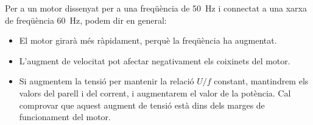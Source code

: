 Per a un motor dissenyat per a una freqüència de \qty{50}{Hz} i connectat a una xarxa de freqüència \qty{60}{Hz}, podem dir en general:
\begin{itemize}
	\item El motor girarà més ràpidament, perquè la freqüència ha augmentat.
	\item L'augment de velocitat pot  afectar negativament els coixinets  del motor.
	\item Si augmentem la tensió per  mantenir la relació $U/f$ constant, mantindrem els valors del parell i del corrent, i augmentarem el valor de la potència. Cal comprovar que aquest augment de tensió està dins dels marges de funcionament del motor.
\end{itemize}
